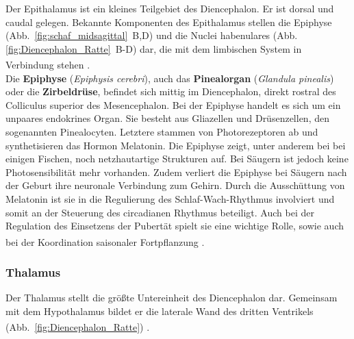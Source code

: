 \documentclass[12pt,a4paper,pdftex]{article}
\begin{document}
Der Epithalamus ist ein kleines Teilgebiet des Diencephalon. Er ist dorsal und caudal gelegen. Bekannte Komponenten des Epithalamus stellen die Epiphyse (Abb.~\ref{fig:schaf_midsagittal}~B,D) und die Nuclei habenulares (Abb.\ref{fig:Diencephalon_Ratte}~B-D) dar, die mit dem limbischen System in Verbindung stehen \textsuperscript{\cite[12]{crossman2014neuroanatomy}}.\\

\noindent Die \textbf{Epiphyse} (\textit{Epiphysis cerebri}), auch das \textbf{Pinealorgan} (\textit{Glandula pinealis}) oder die \textbf{Zirbeldrüse}, befindet sich mittig im Diencephalon, direkt rostral des Colliculus superior des Mesencephalon. Bei der Epiphyse handelt es sich um ein unpaares endokrines Organ.
Sie besteht aus Gliazellen und Drüsenzellen, den sogenannten Pinealocyten. Letztere stammen von Photorezeptoren ab und synthetisieren das Hormon Melatonin. Die Epiphyse zeigt, unter anderem  bei bei einigen Fischen, noch netzhautartige Strukturen auf. Bei Säugern ist jedoch keine Photosensibilität mehr vorhanden. Zudem verliert die Epiphyse bei Säugern nach der Geburt ihre neuronale Verbindung zum Gehirn. Durch die Ausschüttung von Melatonin ist sie in die Regulierung des Schlaf-Wach-Rhythmus involviert und somit an der Steuerung des circadianen Rhythmus beteiligt. Auch bei der Regulation des Einsetzens der Pubertät spielt sie eine wichtige Rolle, sowie auch bei der Koordination saisonaler Fortpflanzung \textsuperscript{\cite[13]{penzlin2005tierphys}}.

\subsubsection{Thalamus}
\label{subsubsec:Thalamus} 

Der Thalamus stellt die größte Untereinheit des Diencephalon dar. Gemeinsam mit dem Hypothalamus bildet er die laterale Wand des dritten Ventrikels (Abb.~\ref{fig:Diencephalon_Ratte})  \textsuperscript{\cite[12]{crossman2014neuroanatomy}}. \\
\end{document}
